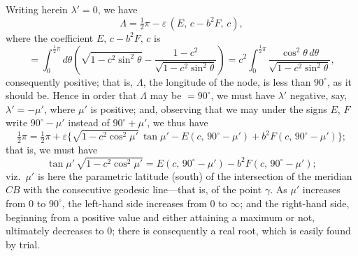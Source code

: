 \documentclass[11pt,a4paper]{article}
\begin{document}
Writing herein $\lambda' = 0$, we have
\[
\Lambda = \tfrac{1}{2}\pi - \varepsilon\,(E,\,c - b^2 F,\,c),
\]
where the coefficient $E,\,c - b^2 F,\,c$ is
\[
= \int_0^{\frac{1}{2}\pi}\!d\theta\!\left(\sqrt{1 - c^2\sin^2\theta}
- \frac{1 - c^2}{\sqrt{1 - c^2\sin^2\theta}}\right)
= c^2\!\int_0^{\frac{1}{2}\pi}\!\frac{\cos^2\theta\,d\theta}{\sqrt{1 - c^2\sin^2\theta}},
\]
consequently positive; that is, $\Lambda$, the longitude of the node, is less
than $90^\circ$, as it should be.  Hence in order that $\Lambda$ may be
$= 90^\circ$, we must have $\lambda'$ negative, say, $\lambda' = -\mu'$, where
$\mu'$ is positive; and, observing that we may under the signs $E$, $F$ write
$90^\circ - \mu'$ instead of $90^\circ + \mu'$, we thus have
\[
\tfrac{1}{2}\pi = \tfrac{1}{2}\pi
+ \varepsilon\bigl\{\sqrt{1 - c^2\cos^2\mu'}\,\tan\mu'
- E(c,\,90^\circ - \mu') + b^2 F(c,\,90^\circ - \mu')\bigr\};
\]
that is, we must have
\[
\tan\mu'\,\sqrt{1 - c^2\cos^2\mu'}
= E(c,\,90^\circ - \mu') - b^2 F(c,\,90^\circ - \mu');
\]
viz.\ $\mu'$ is here the parametric latitude (south) of the intersection of the
meridian $CB$ with the consecutive geodesic line---that is, of the point
$\gamma$.  As $\mu'$ increases from $0$ to $90^\circ$, the left-hand side
increases from $0$ to $\infty$; and the right-hand side, beginning from a
positive value and either attaining a maximum or not, ultimately decreases to
$0$; there is consequently a real root, which is easily found by trial.
\end{document}
